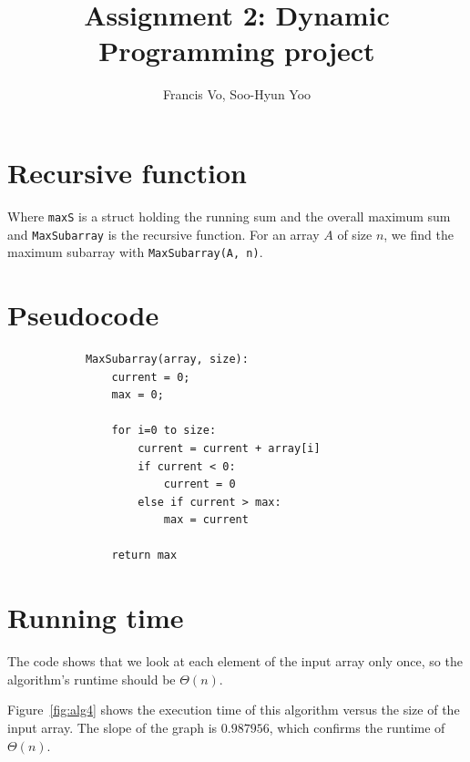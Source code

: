 \documentclass[a4paper,10pt]{article}
\title{Assignment 2: Dynamic Programming project}
\author{Francis Vo, Soo-Hyun Yoo}
\begin{document}
	\maketitle

	\section{Recursive function}
		

		\noindent Where {\tt maxS} is a struct holding the running sum and the overall maximum sum and {\tt MaxSubarray} is the recursive function. For an array $A$ of size $n$, we find the maximum subarray with {\tt MaxSubarray(A, n)}.


	\section{Pseudocode}
		\begin{verbatim}
		    MaxSubarray(array, size):
		        current = 0;
		        max = 0;

		        for i=0 to size:
		            current = current + array[i]
		            if current < 0:
		                current = 0
		            else if current > max:
		                max = current

		        return max
		\end{verbatim}


	\section{Running time}

		The code shows that we look at each element of the input array only once, so the algorithm's runtime should be $\Theta(n)$.

		Figure~\ref{fig:alg4} shows the execution time of this algorithm versus the size of the input array. The slope of the graph is $0.987956$, which confirms the runtime of $\Theta(n)$.
\end{document}
